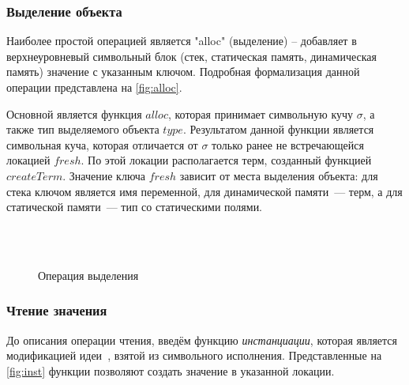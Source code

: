   
\subsubsection{Выделение объекта}
Наиболее простой операцией является "alloc" (выделение) -- добавляет в верхнеуровневый символьный блок (стек, статическая память, динамическая память) значение с указанным ключом. Подробная формализация данной операции представлена на \autoref{fig:alloc}.

Основной является функция $alloc$, которая принимает символьную кучу $\sigma$, а также тип выделяемого объекта $type$. Результатом данной функции является символьная куча, которая отличается от $\sigma$ только ранее не встречающейся локацией $fresh$. По этой локации располагается терм, созданный функцией $createTerm$. Значение ключа $fresh$ зависит от места выделения объекта: для стека ключом является имя переменной, для динамической памяти~--- терм, а для статической памяти~--- тип со статическими полями.

\begin{figure}[H]
\centering
\tiny
\setlength{\jot}{1pt}
\begin{mymathbox}
 \\
 \\
\end{mymathbox}
\normalsize
\caption{Операция выделения} \label{fig:alloc}
\end{figure}

\subsubsection{Чтение значения}

До описания операции чтения, введём функцию \emph{инстанциации}, которая является модификацией идеи~\cite{khurshid2003generalized}, взятой из символьного исполнения. Представленные на \autoref{fig:inst} функции позволяют создать значение в указанной локации.

